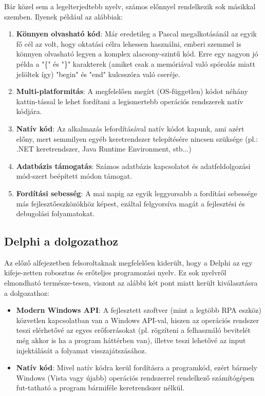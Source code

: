 Bár közel sem a legelterjedtebb nyelv, számos előnnyel rendelkezik sok másikkal szemben. Ilyenek például az alábbiak:
\begin{enumerate}
	\item \textbf{Könnyen olvasható kód}: Már eredetileg a Pascal megalkotásánál az egyik fő cél az volt, hogy oktatási célra lehessen használni, emberi szemmel is könnyen olvasható legyen a komplex alacsony-szintű kód. Erre egy nagyon jó példa a "\{" és "\}" karakterek (amiket csak a memóriával való spórolás miatt jelöltek így) "begin" és "end" kulcsszóra való cseréje.
	\item \textbf{Multi-platformitás}: A megfelelően megírt (OS-független) kódot néhány kattin\hyp{}tással le lehet fordítani a legismertebb operációs rendszerek natív kódjára.
	\item \textbf{Natív kód}: Az alkalmazás lefordításával natív kódot kapunk, ami azért előny, mert semmilyen egyéb keretrendszer telepítésére nincsen szüksége (pl.: .NET keretrendszer, Java Runtime Environment, stb...)
	\item \textbf{Adatbázis támogatás}: Számos adatbázis kapcsolatot és adatfeldolgozási mód\hyp{}szert beépített módon támogat.
	\item \textbf{Fordítási sebesség}: A mai napig az egyik leggyorsabb a fordítási sebessége más fejlesztőeszközökhöz képest, ezáltal felgyorsíva magát a fejlesztési és debugolási folyamatokat.
\end{enumerate}

\subsection{Delphi a dolgozathoz}

Az előző alfejezetben felsoroltaknak megfelelően kiderült, hogy a Delphi az egy kifeje\hyp{}zetten robosztus és erőteljes programozási nyelv. Ez sok nyelvről elmondható természe\hyp{}tesen, viszont az alábbi két pont miatt került kiválasztásra a dolgozathoz:

\begin{itemize}
	\item \textbf{Modern Windows API}: A fejlesztett szoftver (mint a legtöbb RPA eszköz) közvetlen kapcsolatban van a Windows API-val, hiszen az operációs rendszer teszi elérhetővé az egyes erőforrásokat (pl. rögzíteni a felhasználó bevitelét még akkor is ha a program háttérben van), illetve teszi lehetővé az input injektálását a folyamat visszajátszásához.
	\item \textbf{Natív kód}: Mivel natív kódra kerül fordításra a programkód, ezért bármely Windows (Vista vagy újabb) operációs rendszerrel rendelkező számítógépen fut\hyp{}tatható a program bármiféle keretrendszer nélkül.
\end{itemize}














